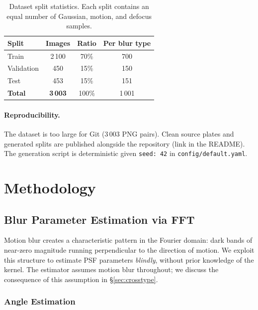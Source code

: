\documentclass[12pt,a4paper]{article}
\begin{document}
\begin{table}[H]
\centering
\begin{tabular}{lccc}
\toprule
\textbf{Split} & \textbf{Images} & \textbf{Ratio} & \textbf{Per blur type} \\
\midrule
Train      & 2\,100 & 70\% & 700 \\
Validation &   450 & 15\% & 150 \\
Test       &   453 & 15\% & 151 \\
\midrule
\textbf{Total} & \textbf{3\,003} & 100\% & 1\,001 \\
\bottomrule
\end{tabular}
\caption{Dataset split statistics. Each split contains an equal number of Gaussian, motion, and defocus samples.}
\label{tab:dataset}
\end{table}

\paragraph{Reproducibility.} The dataset is too large for Git (3\,003 PNG
pairs). Clean source plates and generated splits are published alongside
the repository (link in the README). The generation script is
deterministic given \texttt{seed: 42} in \texttt{config/default.yaml}.

\section{Methodology}

\subsection{Blur Parameter Estimation via FFT}

Motion blur creates a characteristic pattern in the Fourier domain: dark
bands of near-zero magnitude running perpendicular to the direction of
motion. We exploit this structure to estimate PSF parameters
\textit{blindly}, without prior knowledge of the kernel. The estimator
assumes motion blur throughout; we discuss the consequence of this
assumption in \S\ref{sec:crosstype}.

\subsubsection{Angle Estimation}
\end{document}
